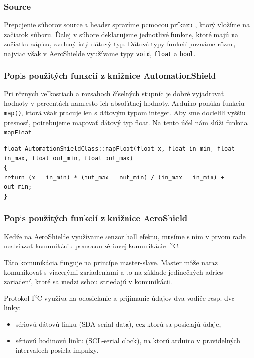 \subsubsection{Source}

Prepojenie súborov source a header spravíme pomocou príkazu , ktorý vložíme na začiatok súboru. Ďalej v súbore deklarujeme jednotlivé funkcie, ktoré majú na začiatku zápisu, zvolený istý dátový typ. Dátové typy funkcií poznáme rôzne\cite{datovetypy}, najviac však v AeroShielde využívame typy \verb|void|, \verb|float| a \verb|bool|. 


\subsubsection{Popis použitých funkcií z knižnice AutomationShield}

Pri rôznych veľkostiach a rozsahoch číselných stupníc je dobré vyjadrovať hodnoty v percentách namiesto ich absolútnej hodnoty. Arduino ponúka funkciu \verb|map()|, ktorá však pracuje len s dátovým typom integer. Aby sme docielili vyššiu presnosť, potrebujeme mapovať dátový typ float. Na tento účel nám slúži funkcia \verb|mapFloat|. 

\begin{lstlisting}[caption={Zdrojový kód funkcie mapFloat.},captionpos=b]
float AutomationShieldClass::mapFloat(float x, float in_min, float in_max, float out_min, float out_max) 
{
return (x - in_min) * (out_max - out_min) / (in_max - in_min) + out_min; 
}
\end{lstlisting}


\subsubsection{Popis použitých funkcií z knižnice AeroShield}


Keďže na AeroShielde využívame senzor hall efektu, musíme s ním v prvom rade nadviazať komunikáciu pomocou sériovej komunikácie I$^{2}$C.

Táto komunikácia funguje na princípe master-slave. Master môže naraz komunikovať s viacerými zariadeniami a to na základe jedinečných adries zariadení, ktoré sa medzi sebou striedajú v komunikácii.

 Protokol I$^{2}$C využíva na odosielanie a prijímanie údajov dva vodiče resp. dve linky: 
\begin{itemize}
\item sériovú dátovú linku (SDA-serial data), cez ktorú sa posielajú údaje, 
\item sériovú hodinovú linku (SCL-serial clock), na ktorú arduino v pravidelných intervaloch posiela impulzy. 
\end{itemize}

